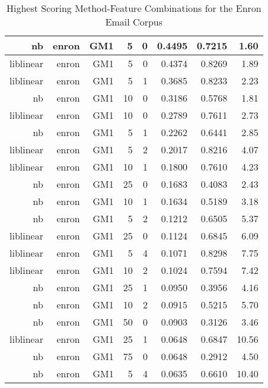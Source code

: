 \begin{table}[htbp!]
\begin{center}
\begin{tabular}{ | r | r | r | r | r | r | r | r | }
			nb & enron & GM1 & 5 & 0 & 0.4495 & 0.7215 & 1.60\\ \hline 
			liblinear & enron & GM1 & 5 & 0 & 0.4374 & 0.8269 & 1.89\\ \hline 
			liblinear & enron & GM1 & 5 & 1 & 0.3685 & 0.8233 & 2.23\\ \hline 
			nb & enron & GM1 & 10 & 0 & 0.3186 & 0.5768 & 1.81\\ \hline 
			liblinear & enron & GM1 & 10 & 0 & 0.2789 & 0.7611 & 2.73\\ \hline 
			nb & enron & GM1 & 5 & 1 & 0.2262 & 0.6441 & 2.85\\ \hline 
			liblinear & enron & GM1 & 5 & 2 & 0.2017 & 0.8216 & 4.07\\ \hline 
			liblinear & enron & GM1 & 10 & 1 & 0.1800 & 0.7610 & 4.23\\ \hline 
			nb & enron & GM1 & 25 & 0 & 0.1683 & 0.4083 & 2.43\\ \hline 
			nb & enron & GM1 & 10 & 1 & 0.1634 & 0.5189 & 3.18\\ \hline 
			nb & enron & GM1 & 5 & 2 & 0.1212 & 0.6505 & 5.37\\ \hline 
			liblinear & enron & GM1 & 25 & 0 & 0.1124 & 0.6845 & 6.09\\ \hline 
			liblinear & enron & GM1 & 5 & 4 & 0.1071 & 0.8298 & 7.75\\ \hline 
			liblinear & enron & GM1 & 10 & 2 & 0.1024 & 0.7594 & 7.42\\ \hline 
			nb & enron & GM1 & 25 & 1 & 0.0950 & 0.3956 & 4.16\\ \hline 
			nb & enron & GM1 & 10 & 2 & 0.0915 & 0.5215 & 5.70\\ \hline 
			nb & enron & GM1 & 50 & 0 & 0.0903 & 0.3126 & 3.46\\ \hline 
			liblinear & enron & GM1 & 25 & 1 & 0.0648 & 0.6847 & 10.56\\ \hline 
			nb & enron & GM1 & 75 & 0 & 0.0648 & 0.2912 & 4.50\\ \hline 
			nb & enron & GM1 & 5 & 4 & 0.0635 & 0.6610 & 10.40\\ \hline 

		\end{tabular}
		\caption{Highest Scoring Method-Feature Combinations for the Enron Email Corpus}
		\label{tab:top_enron_by_score}
	\end{center}
\end{table}

